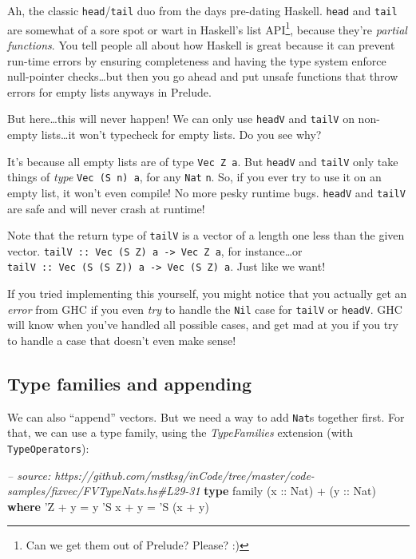 \documentclass[]{article}
\newenvironment{Shaded}{}{}
\newcommand{\KeywordTok}[1]{\textcolor[rgb]{0.00,0.44,0.13}{\textbf{{#1}}}}
\newcommand{\DataTypeTok}[1]{\textcolor[rgb]{0.56,0.13,0.00}{{#1}}}
\newcommand{\CharTok}[1]{\textcolor[rgb]{0.25,0.44,0.63}{{#1}}}
\newcommand{\CommentTok}[1]{\textcolor[rgb]{0.38,0.63,0.69}{\textit{{#1}}}}
\newcommand{\OtherTok}[1]{\textcolor[rgb]{0.00,0.44,0.13}{{#1}}}
\newcommand{\FunctionTok}[1]{\textcolor[rgb]{0.02,0.16,0.49}{{#1}}}
\newcommand{\NormalTok}[1]{{#1}}
\begin{document}
Ah, the classic \texttt{head}/\texttt{tail} duo from the days pre-dating
Haskell. \texttt{head} and \texttt{tail} are somewhat of a sore spot or wart in
Haskell's list API\footnote{Can we get them out of Prelude? Please? :)}, because
they're \emph{partial functions}. You tell people all about how Haskell is great
because it can prevent run-time errors by ensuring completeness and having the
type system enforce null-pointer checks\ldots{}but then you go ahead and put
unsafe functions that throw errors for empty lists anyways in Prelude.

But here\ldots{}this will never happen! We can only use \texttt{headV} and
\texttt{tailV} on non-empty lists\ldots{}it won't typecheck for empty lists. Do
you see why?

It's because all empty lists are of type \texttt{Vec\ Z\ a}. But \texttt{headV}
and \texttt{tailV} only take things of \emph{type} \texttt{Vec\ (S\ n)\ a}, for
any \texttt{Nat} \texttt{n}. So, if you ever try to use it on an empty list, it
won't even compile! No more pesky runtime bugs. \texttt{headV} and
\texttt{tailV} are safe and will never crash at runtime!

Note that the return type of \texttt{tailV} is a vector of a length one less
than the given vector.
\texttt{tailV\ ::\ Vec\ (S\ Z)\ a\ -\textgreater{}\ Vec\ Z\ a}, for
instance\ldots{}or
\texttt{tailV\ ::\ Vec\ (S\ (S\ Z))\ a\ -\textgreater{}\ Vec\ (S\ Z)\ a}. Just
like we want!

If you tried implementing this yourself, you might notice that you actually get
an \emph{error} from GHC if you even \emph{try} to handle the \texttt{Nil} case
for \texttt{tailV} or \texttt{headV}. GHC will know when you've handled all
possible cases, and get mad at you if you try to handle a case that doesn't even
make sense!

\subsection{Type families and appending}\label{type-families-and-appending}

We can also ``append'' vectors. But we need a way to add \texttt{Nat}s together
first. For that, we can use a type family, using the \emph{TypeFamilies}
extension (with \texttt{TypeOperators}):

\begin{Shaded}
\begin{Highlighting}[]
\CommentTok{-- source: https://github.com/mstksg/inCode/tree/master/code-samples/fixvec/FVTypeNats.hs#L29-31}
\KeywordTok{type} \NormalTok{family (}\OtherTok{x ::} \DataTypeTok{Nat}\NormalTok{) }\FunctionTok{+} \NormalTok{(}\OtherTok{y ::} \DataTypeTok{Nat}\NormalTok{) }\KeywordTok{where}
    \CharTok{'Z   + y = y}
    \CharTok{'S x + y = '}\DataTypeTok{S} \NormalTok{(x }\FunctionTok{+} \NormalTok{y)}
\end{Highlighting}
\end{Shaded}
\end{document}
